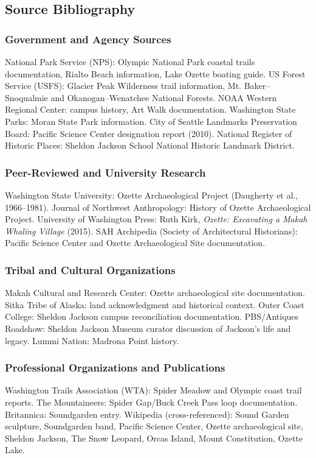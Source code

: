 \documentclass[11pt,letterpaper]{article}
\begin{document}
\subsection{Source Bibliography}

\subsubsection{Government and Agency Sources}
National Park Service (NPS): Olympic National Park coastal trails documentation, Rialto Beach information, Lake Ozette boating guide. US Forest Service (USFS): Glacier Peak Wilderness trail information, Mt. Baker--Snoqualmie and Okanogan--Wenatchee National Forests. NOAA Western Regional Center: campus history, Art Walk documentation. Washington State Parks: Moran State Park information. City of Seattle Landmarks Preservation Board: Pacific Science Center designation report (2010). National Register of Historic Places: Sheldon Jackson School National Historic Landmark District.

\subsubsection{Peer-Reviewed and University Research}
Washington State University: Ozette Archaeological Project (Daugherty et al., 1966--1981). Journal of Northwest Anthropology: History of Ozette Archaeological Project. University of Washington Press: Ruth Kirk, \textit{Ozette: Excavating a Makah Whaling Village} (2015). SAH Archipedia (Society of Architectural Historians): Pacific Science Center and Ozette Archaeological Site documentation.

\subsubsection{Tribal and Cultural Organizations}
Makah Cultural and Research Center: Ozette archaeological site documentation. Sitka Tribe of Alaska: land acknowledgment and historical context. Outer Coast College: Sheldon Jackson campus reconciliation documentation. PBS/Antiques Roadshow: Sheldon Jackson Museum curator discussion of Jackson's life and legacy. Lummi Nation: Madrona Point history.

\subsubsection{Professional Organizations and Publications}
Washington Trails Association (WTA): Spider Meadow and Olympic coast trail reports. The Mountaineers: Spider Gap/Buck Creek Pass loop documentation. Britannica: Soundgarden entry. Wikipedia (cross-referenced): Sound Garden sculpture, Soundgarden band, Pacific Science Center, Ozette archaeological site, Sheldon Jackson, The Snow Leopard, Orcas Island, Mount Constitution, Ozette Lake.
\end{document}
